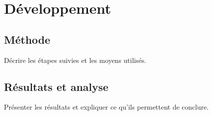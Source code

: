 \section{Développement}

\subsection{Méthode}
Décrire les étapes suivies et les moyens utilisés.

\subsection{Résultats et analyse}
Présenter les résultats et expliquer ce qu'ils permettent de conclure.

